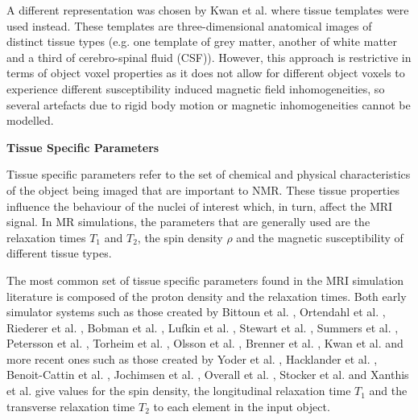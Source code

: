 \hfill

A different representation was chosen by
Kwan et al. \cite{Kwan1997} \cite{Kwan1999}
where tissue templates \cite{Collins1995} were used instead.
These templates are three-dimensional anatomical images of distinct tissue types (e.g. one template of grey matter, another of white matter and a third of cerebro-spinal fluid (CSF)). 
However, this approach is restrictive in terms of object voxel properties as it does not allow for different object voxels to experience different susceptibility induced magnetic field inhomogeneities, so several artefacts due to rigid body motion or magnetic inhomogeneities cannot be modelled.

\hfill

\large \textbf{Tissue Specific Parameters} \normalsize

Tissue specific parameters refer to the set of chemical and physical characteristics of the object being imaged that are important to NMR.
These tissue properties influence the behaviour of the nuclei of interest which, in turn, affect the MRI signal.
In MR simulations, the parameters that are generally used are the relaxation times $T_1$ and $T_2$, the spin density $\rho$ and the magnetic susceptibility of different tissue types.

\hfill

The most common set of tissue specific parameters 
found in the MRI simulation literature is composed of the proton density and the relaxation times.
Both early simulator systems such as those created by
Bittoun et al. \cite{Bittoun1984},
Ortendahl et al. \cite{Ortendahl1984},
Riederer et al. \cite{Riederer1984},
Bobman et al. \cite{Bobman1985},
Lufkin et al. \cite{Lufkin1986},
Stewart et al. \cite{Stewart1986},
Summers et al. \cite{Summers1986},
Petersson et al. \cite{Petersson1993},
Torheim et al. \cite{Torheim1994}, 
Olsson et al. \cite{Olsson1995},
Brenner et al. \cite{Brenner1997},
Kwan et al. \cite{Kwan1997} and
more recent ones such as those created by
Yoder et al. \cite{Yoder2004},
Hacklander et al. \cite{Hacklander2005},
Benoit-Cattin et al. \cite{Benoit-Cattin2005},
Jochimsen et al. \cite{Jochimsen2004},
Overall et al. \cite{Overall2007},
Stocker et al. \cite{Stocker2010} and
Xanthis et al. \cite{Xanthis2014}
give values for the spin density, the longitudinal relaxation time $T_1$ and the transverse relaxation time $T_2$ to each element in the input object.

